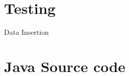 \documentclass[a4paper,10pt,toc=graduated]{article}
\begin{document}
\begin{appendices}
\section{Testing}
\begin{mySubsection}{Data Insertion}

\end{mySubsection}
\section{Java Source code}

\end{appendices}
\end{document}
